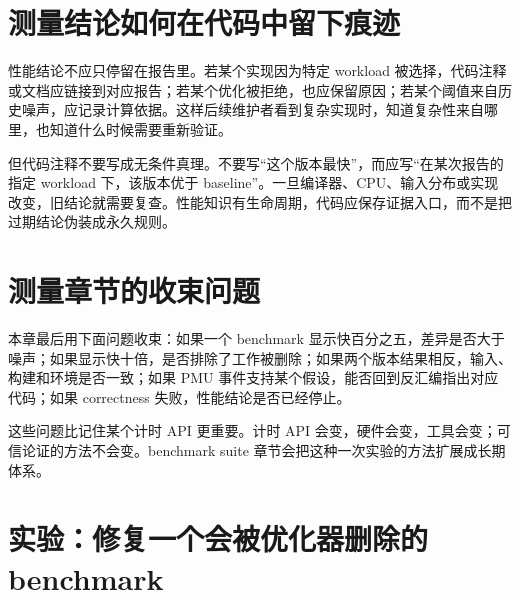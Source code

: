 \section{测量结论如何在代码中留下痕迹}

性能结论不应只停留在报告里。若某个实现因为特定 workload 被选择，代码注释或文档应链接到对应报告；若某个优化被拒绝，也应保留原因；若某个阈值来自历史噪声，应记录计算依据。这样后续维护者看到复杂实现时，知道复杂性来自哪里，也知道什么时候需要重新验证。

但代码注释不要写成无条件真理。不要写“这个版本最快”，而应写“在某次报告的指定 workload 下，该版本优于 baseline”。一旦编译器、CPU、输入分布或实现改变，旧结论就需要复查。性能知识有生命周期，代码应保存证据入口，而不是把过期结论伪装成永久规则。

\section{测量章节的收束问题}

本章最后用下面问题收束：如果一个 benchmark 显示快百分之五，差异是否大于噪声；如果显示快十倍，是否排除了工作被删除；如果两个版本结果相反，输入、构建和环境是否一致；如果 PMU 事件支持某个假设，能否回到反汇编指出对应代码；如果 correctness 失败，性能结论是否已经停止。

这些问题比记住某个计时 API 更重要。计时 API 会变，硬件会变，工具会变；可信论证的方法不会变。benchmark suite 章节会把这种一次实验的方法扩展成长期体系。

\section{实验：修复一个会被优化器删除的 benchmark}

